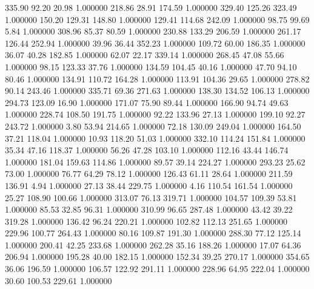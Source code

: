     335.90     92.20     20.98  1.000000
    218.86     28.91    174.59  1.000000
    329.40    125.26    323.49  1.000000
    150.20    129.31    148.80  1.000000
    129.41    114.68    242.09  1.000000
     98.75     99.69      5.84  1.000000
    308.96     85.37     80.59  1.000000
    230.88    133.29    206.59  1.000000
    261.17    126.44    252.94  1.000000
     39.96     36.44    352.23  1.000000
    109.72     60.00    186.35  1.000000
     36.07     40.28    182.85  1.000000
     62.07     22.17    339.14  1.000000
    268.45     47.08     55.66  1.000000
     98.15    123.33     37.76  1.000000
    134.59    104.45     40.16  1.000000
     47.70     94.10     80.46  1.000000
    134.91    110.72    164.28  1.000000
    113.91    104.36     29.65  1.000000
    278.82     90.14    243.46  1.000000
    335.71     69.36    271.63  1.000000
    138.30    134.52    106.13  1.000000
    294.73    123.09     16.90  1.000000
    171.07     75.90     89.44  1.000000
    166.90     94.74     49.63  1.000000
    228.74    108.50    191.75  1.000000
     92.22    133.96     27.13  1.000000
    199.10     92.27    243.72  1.000000
      3.80     53.94    214.65  1.000000
     72.18    130.09    249.04  1.000000
    164.50     37.21    118.04  1.000000
     10.93    118.20     51.03  1.000000
    332.10    114.24    151.84  1.000000
     35.34     47.16    118.37  1.000000
     56.26     47.28    103.10  1.000000
    112.16     43.44    146.74  1.000000
    181.04    159.63    114.86  1.000000
     89.57     39.14    224.27  1.000000
    293.23     25.62     73.00  1.000000
     76.77     64.29     78.12  1.000000
    126.43     61.11     28.64  1.000000
    211.59    136.91      4.94  1.000000
     27.13     38.44    229.75  1.000000
      4.16    110.54    161.54  1.000000
     25.27    108.90    100.66  1.000000
    313.07     76.13    319.71  1.000000
    104.57    109.39     53.81  1.000000
     85.53     32.85     96.31  1.000000
    310.99     96.65    287.48  1.000000
     43.42     39.22    319.28  1.000000
    136.42     96.24    220.21  1.000000
    102.82    112.13    251.65  1.000000
    229.96    100.77    264.43  1.000000
     80.16    109.87    191.30  1.000000
    288.30     77.12    125.14  1.000000
    200.41     42.25    233.68  1.000000
    262.28     35.16    188.26  1.000000
     17.07     64.36    206.94  1.000000
    195.28     40.00    182.15  1.000000
    152.34     39.25    270.17  1.000000
    354.65     36.06    196.59  1.000000
    106.57    122.92    291.11  1.000000
    228.96     64.95    222.04  1.000000
     30.60    100.53    229.61  1.000000
